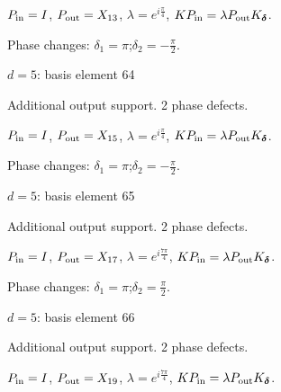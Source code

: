 $P_{\rm in}=I$, \quad $P_{\rm out}=X_{13}$, \quad $\lambda=e^{i\frac{\pi}{4}}$, \qquad $K P_{\rm in}=\lambda P_{\rm out}K_{\boldsymbol\delta}$.
\par\smallskip\begin{minipage}{.98\linewidth}\small Phase changes: $\delta_{1}=\pi$;\quad $\delta_{2}=-\frac{\pi}{2}$.\end{minipage}
\vfill
{\footnotesize\texttt{}}
\newpage
{}
{\Large $d=5$: basis element 64}\par
Additional output support. 2 phase defects.
\begin{center}
\end{center}
\vspace{-1mm}
$P_{\rm in}=I$, \quad $P_{\rm out}=X_{15}$, \quad $\lambda=e^{i\frac{\pi}{4}}$, \qquad $K P_{\rm in}=\lambda P_{\rm out}K_{\boldsymbol\delta}$.
\par\smallskip\begin{minipage}{.98\linewidth}\small Phase changes: $\delta_{1}=\pi$;\quad $\delta_{2}=-\frac{\pi}{2}$.\end{minipage}
\vfill
{\footnotesize\texttt{}}
\newpage
{}
{\Large $d=5$: basis element 65}\par
Additional output support. 2 phase defects.
\begin{center}
\end{center}
\vspace{-1mm}
$P_{\rm in}=I$, \quad $P_{\rm out}=X_{17}$, \quad $\lambda=e^{i\frac{7\pi}{4}}$, \qquad $K P_{\rm in}=\lambda P_{\rm out}K_{\boldsymbol\delta}$.
\par\smallskip\begin{minipage}{.98\linewidth}\small Phase changes: $\delta_{1}=\pi$;\quad $\delta_{2}=\frac{\pi}{2}$.\end{minipage}
\vfill
{\footnotesize\texttt{}}
\newpage
{}
{\Large $d=5$: basis element 66}\par
Additional output support. 2 phase defects.
\begin{center}
\end{center}
\vspace{-1mm}
$P_{\rm in}=I$, \quad $P_{\rm out}=X_{19}$, \quad $\lambda=e^{i\frac{7\pi}{4}}$, \qquad $K P_{\rm in}=\lambda P_{\rm out}K_{\boldsymbol\delta}$.
